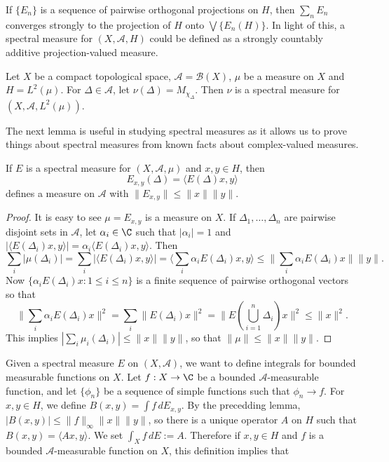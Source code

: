 \begin{example}
If $\{E_n\}$ is a sequence of pairwise orthogonal projections on $H$, then $\sum_nE_n$ converges strongly to the projection of $H$ onto $\bigvee\{E_n(H)\}$. In light of this, a spectral measure for $(X,\mathcal{A},H)$ could be defined as a strongly countably additive projection-valued measure.
\end{example}
\begin{example}
Let $X$ be a compact topological space, $\mathcal{A}=\mathcal{B}(X)$, $\mu$ be a measure on $X$ and $H=L^2(\mu)$. For $\Delta\in\mathcal{A}$, let $\nu(\Delta)=M_{\chi_\Delta}$. Then $\nu$ is a spectral measure for $(X,\mathcal{A},L^2(\mu))$.
\end{example}
The next lemma is useful in studying spectral measures as it allows us to prove things about spectral measures from known facts about complex-valued measures.
\begin{lemma}\label{Hilbert space spectral measure to measure}
If $E$ is a spectral measure for $(X,\mathcal{A},\mu)$ and $x,y\in H$, then
\[E_{x,y}(\Delta)=\langle E(\Delta)x,y\rangle\]
defines a measure on $\mathcal{A}$ with $\|E_{x,y}\|\leq\|x\|\|y\|$.
\end{lemma}
\begin{proof}
It is easy to see $\mu=E_{x,y}$ is a measure on $X$. If $\Delta_1,\dots,\Delta_n$ are pairwise disjoint sets in $\mathcal{A}$, let $\alpha_i\in\C$ such that $|\alpha_i|=1$ and $|\langle E(\Delta_i)x,y\rangle|=\alpha_i\langle E(\Delta_i)x,y\rangle$. Then
\[\sum_i|\mu(\Delta_i)|=\sum_i|\langle E(\Delta_i)x,y\rangle|=\langle\sum_i\alpha_iE(\Delta_i)x,y\rangle\leq\|\sum_i\alpha_iE(\Delta_i)x\|\|y\|.\]
Now $\{\alpha_iE(\Delta_i)x:1\leq i\leq n\}$ is a finite sequence of pairwise orthogonal vectors so that
\[\|\sum_i\alpha_iE(\Delta_i)x\|^2=\sum_i\|E(\Delta_i)x\|^2=\|E(\bigcup_{i=1}^{n}\Delta_i)x\|^2\leq\|x\|^2.\]
This implies $|\sum_i\mu_i(\Delta_i)|\leq\|x\|\|y\|$, so that $\|\mu\|\leq\|x\|\|y\|$.
\end{proof}
Given a spectral measure $E$ on $(X,\mathcal{A})$, we want to define integrals for bounded measurable functions on $X$. Let $f:X\to\C$ be a bounded $\mathcal{A}$-measurable function, and let $\{\phi_n\}$ be a sequence of simple functions such that $\phi_n\to f$. For $x,y\in H$, we define $B(x,y)=\int f\,dE_{x,y}$. By the precedding lemma, $|B(x,y)|\leq\|f\|_\infty\|x\|\|y\|$, so there is a unique operator $A$ on $H$ such that $B(x,y)=\langle Ax,y\rangle$. We set $\int_Xf\,dE:=A$. Therefore if $x,y\in H$ and $f$ is a bounded $\mathcal{A}$-measurable function on $X$, this definition implies that
